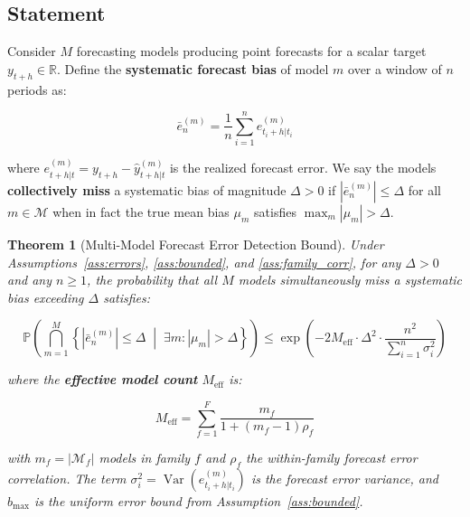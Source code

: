 \documentclass[12pt,a4paper]{article}
\newtheorem{theorem}{Theorem}[section]
\DeclareMathOperator{\Var}{Var}
\begin{document}
\subsection{Statement}

Consider $M$ forecasting models producing point forecasts for a scalar
target $y_{t+h} \in \mathbb{R}$.  Define the \textbf{systematic forecast
bias} of model $m$ over a window of $n$ periods as:

\begin{equation}
    \bar{e}_n^{(m)} = \frac{1}{n} \sum_{i=1}^{n} e_{t_i+h|t_i}^{(m)}
    \label{eq:systematic_bias}
\end{equation}

where $e_{t+h|t}^{(m)} = y_{t+h} - \hat{y}_{t+h|t}^{(m)}$ is the
realized forecast error.  We say the models \textbf{collectively miss}
a systematic bias of magnitude $\Delta > 0$ if $|\bar{e}_n^{(m)}| \leq
\Delta$ for all $m \in \mathcal{M}$ when in fact the true mean bias
$\mu_m$ satisfies $\max_m |\mu_m| > \Delta$.

\begin{theorem}[Multi-Model Forecast Error Detection Bound]
\label{thm:error_detection}
Under Assumptions~\ref{ass:errors}, \ref{ass:bounded}, and
\ref{ass:family_corr}, for any $\Delta > 0$ and any $n \geq 1$, the
probability that all $M$ models simultaneously miss a systematic bias
exceeding $\Delta$ satisfies:

\begin{equation}
    \boxed{
    \mathbb{P}\left(\bigcap_{m=1}^{M} \left\{|\bar{e}_n^{(m)}| \leq \Delta
    \;\middle|\; \exists m: |\mu_m| > \Delta\right\}\right)
    \leq \exp\left(-2 M_{\text{eff}} \cdot \Delta^2 \cdot
    \frac{n^2}{\sum_{i=1}^n \sigma_i^2}\right)
    }
    \label{eq:thm1_main}
\end{equation}

where the \textbf{effective model count} $M_{\text{eff}}$ is:

\begin{equation}
    M_{\text{eff}} = \sum_{f=1}^{F} \frac{m_f}{1 + (m_f - 1)\rho_f}
    \label{eq:meff}
\end{equation}

with $m_f = |\mathcal{M}_f|$ models in family $f$ and $\rho_f$ the
within-family forecast error correlation.  The term
$\sigma_i^2 = \Var(e_{t_i+h|t_i}^{(m)})$ is the forecast error variance,
and $b_{\max}$ is the uniform error bound from Assumption~\ref{ass:bounded}.
\end{theorem}
\end{document}

